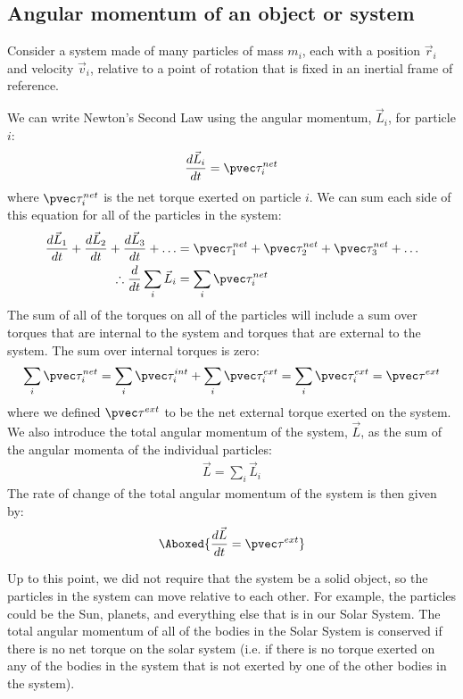 \subsection{Angular momentum of an object or system}
Consider a system made of many particles of mass $m_i$, each with a position $\vec r_i$ and velocity $\vec v_i$, relative to a point of rotation that is fixed in an inertial frame of reference. 

We can write Newton's Second Law using the angular momentum, $\vec L_i$, for particle $i$:
\begin{align*}
\frac{d\vec L_i}{dt} = \pvec \tau_i^{net}
\end{align*}
where $\pvec \tau_i^{net}$ is the net torque exerted on particle $i$. We can sum each side of this equation for all of the particles in the system:
\begin{align*}
\frac{d\vec L_1}{dt} + \frac{d\vec L_2}{dt} + \frac{d\vec L_3}{dt} + \dots &= \pvec \tau_1^{net} + \pvec \tau_2^{net} +\pvec \tau_3^{net} + \dots\\
\therefore \frac{d}{dt} \sum_i\vec L_i &= \sum_i \pvec \tau_i^{net}
\end{align*}
The sum of all of the torques on all of the particles will include a sum over torques that are internal to the system and torques that are external to the system. The sum over internal torques is zero:
\begin{align*}
\sum_i \pvec\tau_i^{net} = \sum_i \pvec\tau_i^{int} + \sum_i \pvec\tau_i^{ext} = \sum_i \pvec\tau_i^{ext} = \pvec\tau^{ext}
\end{align*}
where we defined $\pvec\tau^{ext}$ to be the net external torque exerted on the system. We also introduce the total angular momentum of the system, $\vec L$, as the sum of the angular momenta of the individual particles:
\begin{align*}
\vec L = \sum_i\vec L_i
\end{align*}
The rate of change of the total angular momentum of the system is then given by:
\begin{align}
\Aboxed{\frac{d\vec L}{dt} = \pvec \tau^{ext}}
\end{align}

Up to this point, we did not require that the system be a solid object, so the particles in the system can move relative to each other. For example, the particles could be the Sun, planets, and everything else that is in our Solar System. The total angular momentum of all of the bodies in the Solar System is conserved if there is no net torque on the solar system (i.e. if there is no torque exerted on any of the bodies in the system that is not exerted by one of the other bodies in the system).

